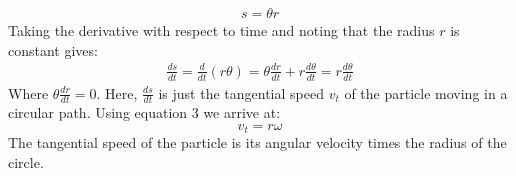 \documentclass[a4paper]{article}
\newcommand\der[2]{\frac{d #1}{d #2}}
\begin{document}
\begin{align*}
    s = \theta r
\end{align*}
Taking the derivative with respect to time and noting that the radius $r$ is constant gives:
\begin{align*}
    \der{s}{t} = \der{}{t}(r\theta) = \theta\der{r}{t} + r\der{\theta}{t} = r\der{\theta}{t}
\end{align*}
Where $\theta\der{r}{t} = 0$. Here, $\der{s}{t}$ is just the tangential speed $v_t$ of the particle moving in a circular path. Using equation 3 we arrive at:
\begin{equation}
    v_t = r\omega
\end{equation}
The tangential speed of the particle is its angular velocity times the radius of the circle.
\end{document}
